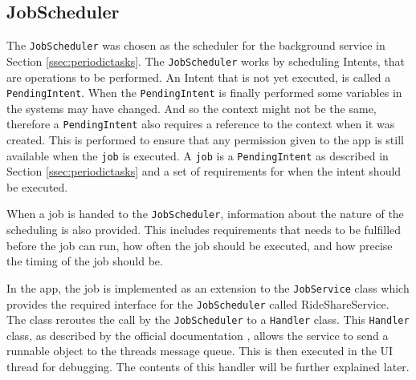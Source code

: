 \subsection{JobScheduler}
The \texttt{JobScheduler} was chosen as the scheduler for the background service in Section \ref{ssec:periodictasks}.
The \texttt{JobScheduler} works by scheduling Intents, that are operations to be performed. %
An Intent that is not yet executed, is called a \texttt{PendingIntent}.
When the \texttt{PendingIntent} is finally performed some variables in the systems may have changed.
And so the context might not be the same, therefore a \texttt{PendingIntent} also requires a reference to the context when it was created.
This is performed to ensure that any permission given to the app is still available when the \texttt{job} is executed.
A \texttt{job} is a \texttt{PendingIntent} as described in Section \ref{ssec:periodictasks} and a set of requirements for when the intent should be executed.

When a job is handed to the \texttt{JobScheduler}, information about the nature of the scheduling is also provided.
This includes requirements that needs to be fulfilled before the job can run, how often the job should be executed, and how precise the timing of the job should be.


In the app, the job is implemented as an extension to the \texttt{JobService} class which provides the required interface for the \texttt{JobScheduler} called RideShareService.
The class reroutes the call by the \texttt{JobScheduler} to a \texttt{Handler} class.
This \texttt{Handler} class, as described by the official documentation \cite{handler}, allows the service to send a runnable object to the threads message queue.
This is then executed in the UI thread for debugging.
The contents of this handler will be further explained later. 


